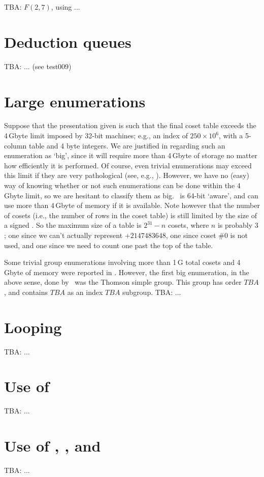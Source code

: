 TBA: $F(2,7)$, using  \amp {} ...

\section{Deduction queues}

TBA: ... (see test009)

\section{Large enumerations}

Suppose that the presentation given is such that the final coset table
  exceeds the 4\,Gbyte limit imposed by 32-bit machines; e.g., an index of
  $250 \times 10^6$\kern-2pt, with a 5-column table and 4 byte integers.
We are justified in regarding such an enumeration as `big'\kern-1.5pt, 
  since it will require more than 4\,Gbyte of storage no matter how
  efficiently it is performed.
Of course, even trivial enumerations may exceed this limit if they are
  very pathological (see, e.g., \cite{HR00}).
However, we have no (easy) way of knowing whether or not such enumerations
  can be done within the 4\,Gbyte limit, so we are hesitant to classify
  them as big.
\ace\ is 64-bit `aware'\kern-1.5pt, and can use more than 4\,Gbyte of
  memory if it is available.
Note however that the number of cosets (i.e., the number of rows in the
  coset table) is still limited by the size of a signed .
So the maximum size of a table is $2^{31} - n$ cosets, where $n$ is
  probably $3$; one since we can't actually represent $+2147483648$, one
  since coset \#0 is not used, and one since we need to count one past the
  top of the table.

Some trivial group enumerations involving more than 1\,G total cosets 
  and 4\,Gbyte of memory were reported in \cite{HR00}.
However, the first big enumeration, in the above sense, done by \ace\ was
  the Thomson simple group.
This group has order $TBA$, and contains $TBA$ as an index $TBA$ subgroup.
TBA: ...

\section{Looping}

TBA: ...

\section{Use of }\label{ex007}

TBA: ...

\section{Use of , ,  and } 

TBA: ...

